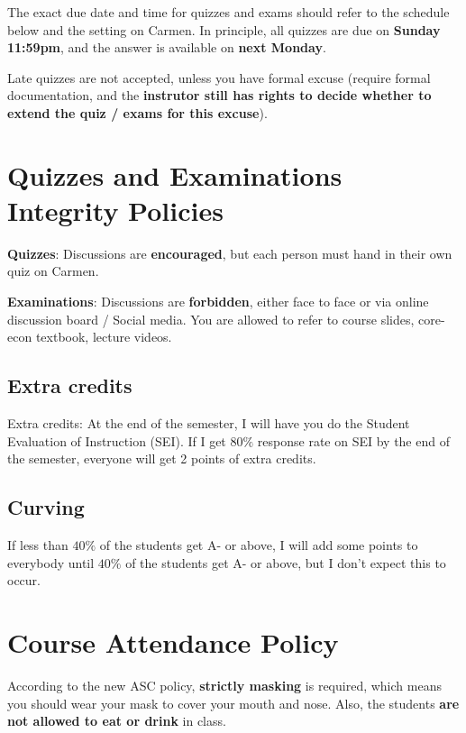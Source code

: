 \documentclass[12pt]{article}
\begin{document}
The exact due date and time for quizzes and exams should refer to the schedule below and the setting on Carmen.
In principle, all quizzes are due on \textbf{Sunday 11:59pm}, and the answer is available on \textbf{next Monday}.

Late quizzes are not accepted, unless you have formal excuse (require formal documentation, and the \textbf{instrutor still has rights to decide whether to extend the quiz / exams for this excuse}).

\section*{Quizzes and Examinations Integrity Policies}

\textbf{Quizzes}: Discussions are \textbf{encouraged}, but each person must hand in their own quiz on Carmen.

\textbf{Examinations}: Discussions are \textbf{forbidden}, either face to face or via online discussion board / Social media. You are allowed to refer to course slides, core-econ textbook, lecture videos.

\subsection*{Extra credits}

Extra credits: At the end of the semester, I will have you do the Student Evaluation of Instruction (SEI). If I get $80\%$ response rate on SEI by the end of the semester, everyone will get 2 points of extra credits.

\subsection*{Curving}

If less than $40\%$ of the students get A- or above, I will add some points to everybody until $40\%$ of the students get A- or above, but I don’t expect this to occur.

\newpage

\section*{Course Attendance Policy}

According to the new ASC policy, \textbf{strictly masking} is required, which means you should wear your mask to cover your mouth and nose.
Also, the students \textbf{are not allowed to eat or drink} in class.
\end{document}

